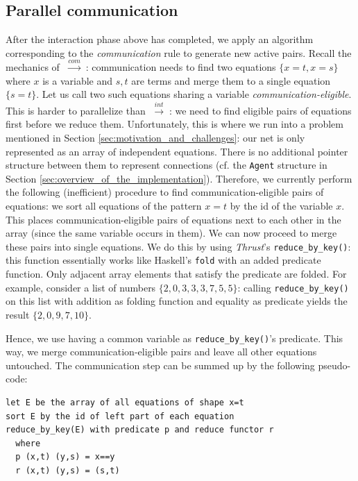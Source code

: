 \documentclass[submission,copyright,creativecommons]{eptcs}
\newcommand{\lwint}{$\;\stackrel{int}{\longrightarrow}\;$}
\newcommand{\lwcom}{$\;\stackrel{com}{\longrightarrow}\;$}
\begin{document}
\subsection{Parallel communication}
\label{sec:parallel-communication}
After the interaction phase above has completed, we apply an algorithm
corresponding to the \emph{communication} rule to generate new active pairs.
Recall the mechanics of \lwcom: communication needs to find two equations
$\{ x=t, x=s \}$ where $x$ is a variable and $s,t$ are terms and merge them to a
single equation $\{ s=t \}$.
Let us call two such equations sharing a variable \emph{communication-eligible}.
 This is harder to parallelize than \lwint: we need
to find eligible pairs of equations first before we reduce them. Unfortunately, this is where we
run into a problem mentioned in Section \ref{sec:motivation_and_challenges}: our
net is only represented as an array of independent equations. There is no
additional pointer structure between them to represent connections (cf. the
\texttt{Agent} structure in Section \ref{sec:overview_of_the_implementation}).
Therefore, we currently perform the following (inefficient) procedure to find
communication-eligible pairs of equations: we sort all equations of
the pattern $x=t$ by the id of the variable $x$.
This places communication-eligible pairs of equations next to each other in the
array (since the same variable occurs in them). We can now proceed to merge
these pairs into single equations. We do this by using \emph{Thrust}'s
\lstinline{reduce_by_key()}: this function essentially works like Haskell's
\texttt{fold} with an added predicate function. Only adjacent array elements
that satisfy the predicate are folded. For example, consider a list of numbers
$\{2,0,3,3,3,7,5,5\}$: calling \lstinline{reduce_by_key()} on this list with
addition as folding function and equality as predicate yields the result
$\{2,0,9,7,10\}$.

Hence, we use having a common variable as \lstinline;reduce_by_key();'s
predicate. This way, we merge communication-eligible pairs and leave all other
equations untouched. The communication step can be summed up by the following
pseudo-code:

\begin{lstlisting}
let E be the array of all equations of shape x=t
sort E by the id of left part of each equation
reduce_by_key(E) with predicate p and reduce functor r
  where
  p (x,t) (y,s) = x==y
  r (x,t) (y,s) = (s,t)
\end{lstlisting}
\end{document}
